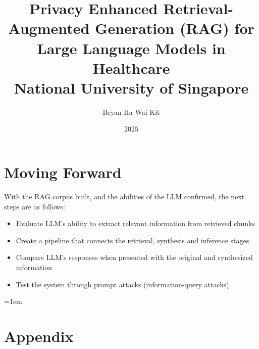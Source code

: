\documentclass[
    12pt,
    ]{report}
\title{
  {Privacy Enhanced Retrieval-Augmented Generation (RAG) for Large Language Models in Healthcare}\\
  {\large National University of Singapore}\\
}
\author{Bryan Ha Wai Kit}
\date{2025}
\begin{document}
\maketitle

\clearpage
{}

\clearpage
{}  %

\clearpage
\tableofcontents
\clearpage
\listoffigures
\clearpage
\listoftables

\clearpage
{}
\setcounter{page}{1}





\section{Moving Forward}

With the RAG corpus built, and the abilities of the LLM confirmed, the next steps are as follows:
\begin{itemize}
	\item Evaluate LLM's ability to extract relevant information from retrieved chunks
	\item Create a pipeline that connects the retrieval, synthesis and inference stages
	\item Compare LLM's responses when presented with the original and synthesized information
	\item Test the system through prompt attacks (information-query attacks)
\end{itemize}


\emergencystretch=1em
\printbibliography[title=References]
\nocite{*}
\break

\appendix
\section{Appendix}

\end{document}
